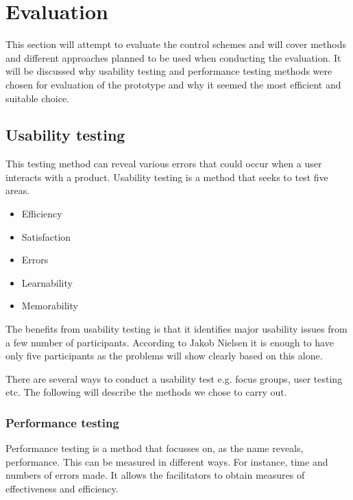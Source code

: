 \section{Evaluation}
This section will attempt to evaluate the control schemes and will cover methods and different approaches planned to be used when conducting the evaluation. 
It will be discussed why usability testing and performance testing methods were chosen for evaluation of the prototype and why it seemed the most efficient and suitable choice.%

\subsection{Usability testing}

This testing method can reveal various errors that could occur when a user interacts with a product.
Usability testing is a method that seeks to test five areas. \cite{usability}

\begin{itemize}
\item Efficiency
\item Satisfaction
\item Errors
\item Learnability
\item Memorability
\end{itemize}

The benefits from usability testing is that it identifies major usability issues from a few number of participants. \cite{usability}
According to Jakob Nielsen it is enough to have only five participants as the problems will show clearly based on this alone. \cite{usability}

There are several ways to conduct a usability test e.g. focus groups, user testing etc.
The following will describe the methods we chose to carry out.

\subsubsection{Performance testing}

Performance testing is a method that focusses on, as the name reveals, performance. This can be measured in different ways. For instance, time and numbers of errors made.
It allows the facilitators to obtain measures of effectiveness and efficiency. \cite{performance}

